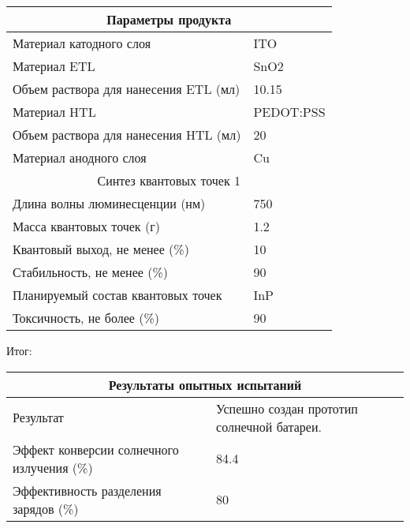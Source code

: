\begin{enumerate}
    \begin{table}[H]
        \begin{center}
            \begin{tabular}{|p{9cm}|p{4cm}|}
                \hline
                \multicolumn{2}{|c|}{Параметры продукта} \\
                \hline
                Материал катодного слоя	&ITO \\
                \hline
                Материал ETL	&SnO2 \\
                \hline
                Объем раствора для нанесения ETL (мл)&	10.15 \\
                \hline
                Материал HTL	&PEDOT:PSS \\
                \hline
                Объем раствора для нанесения HTL (мл)&	20 \\
                \hline
                Материал анодного слоя&	Cu \\
                \hline
                \multicolumn{2}{|c|}{Синтез квантовых точек 1} \\
                \hline
                Длина волны люминесценции (нм)&	750 \\
                \hline
                Масса квантовых точек (г)	&1.2 \\
                \hline
                Квантовый выход, не менее (\%)&	10 \\
                \hline
                Стабильность, не менее (\%)&	90 \\
                \hline
                Планируемый состав квантовых точек	&InP \\
                \hline
                Токсичность, не более (\%)&	90 \\
                \hline
            \end{tabular}
        \end{center}
    \end{table}

    Итог:

    \begin{table}[H]
        \begin{center}
            \begin{tabular}{|p{9cm}|p{6cm}|}
                \hline
                \multicolumn{2}{|c|}{Результаты опытных испытаний} \\
                \hline
                Результат	&Успешно создан прототип солнечной батареи. \\
                \hline
                Эффект конверсии солнечного излучения (\%)	&84.4 \\
                \hline
                Эффективность разделения зарядов (\%)&	80 \\
                \hline
            \end{tabular}
        \end{center}
    \end{table}


\end{enumerate}
